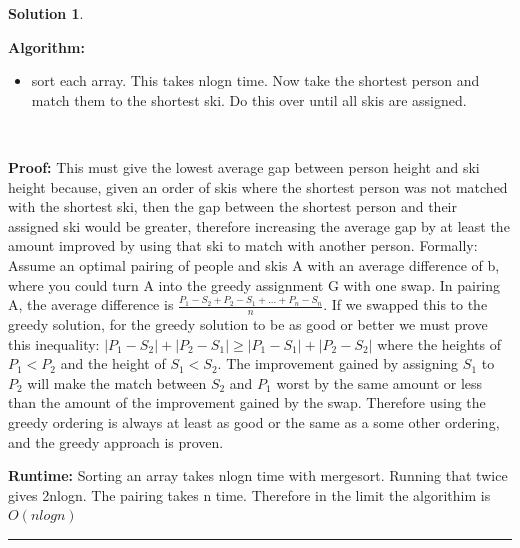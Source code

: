 \documentclass{article}
\theoremstyle{definition}
\def\fline{\rule{0.75\linewidth}{0.5pt}}
\newcommand{\finishline}{\begin{center}\fline\end{center}}
\newtheorem*{solution*}{Solution}
\newenvironment{solution}{\begin{solution*}}{{\finishline} \end{solution*}}
\begin{document}
\begin{solution}

    \

    \textbf{Algorithm:}
    \begin{itemize}
        \item sort each array. This takes nlogn time. Now take the shortest person and match them to the shortest ski. Do this over until all skis are assigned.
    \end{itemize}




    \

    \textbf{Proof: } This must give the lowest average gap between person height and ski height because, given an order of skis where the shortest person was not matched with the shortest ski, then the gap between the shortest person and their assigned ski would be greater, therefore increasing the average gap by at least the amount improved by using that ski to match with another person.
    Formally:
    Assume an optimal pairing of people and skis A with an average difference of b, where you could turn A into the greedy assignment G with one swap. In pairing A, the average difference is $\frac{P_1 - S_2 + P_2 - S_1 + ... + P_n - S_n}{n}$. If we swapped this to the greedy solution, for the greedy solution to be as good or better we must prove this inequality: $|P_1 - S_2| + |P_2 - S_1| \ge |P_1 - S_1| + |P_2 - S_2|$ where the heights of $P_1 < P_2$ and the height of $S_1 < S_2$. The improvement gained by assigning $S_1$ to $P_2$ will make the match between $S_2$ and $P_1$ worst by the same amount or less than the amount of the improvement gained by the swap. Therefore using the greedy ordering is always at least as good or the same as a some other ordering, and the greedy approach is proven.




    
    \textbf{Runtime: } Sorting an array takes nlogn time with mergesort. Running that twice gives 2nlogn. The pairing takes n time. Therefore in the limit the algorithim is $O(nlogn)$


\end{solution}
\end{document}
